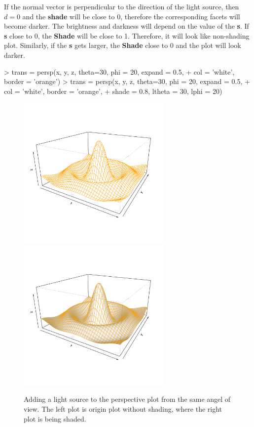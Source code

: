 \documentclass{report}
\begin{document}
If the normal vector is perpendicular to the direction of the light source, then $d = 0$ and the \textbf{shade} will be close to 0, therefore the corresponding facets will become darker. The brightness and darkness will depend on the value of the \textbf{s}. If \textbf{s} close to 0, the \textbf{Shade} will be close to 1. Therefore, it will look like non-shading plot. Similarly, if the \textbf{s} gets larger, the \textbf{Shade} close to 0 and the plot will look darker.

\begin{Schunk}
\begin{Sinput}
> trans = persp(x, y, z, theta=30, phi = 20, expand = 0.5,
+               col = 'white', border = 'orange')
> trans = persp(x, y, z, theta=30, phi = 20, expand = 0.5,
+               col = 'white', border = 'orange', 
+               shade = 0.8, ltheta = 30, lphi = 20)
\end{Sinput}
\end{Schunk}


\begin{figure}[h]
	\begin{center}
		\includegraphics[height = 7.5cm, width = 7.5cm]{figure/Lighting_1.pdf}
		\includegraphics[height = 7.5cm, width = 7.5cm]{figure/Lighting_2.pdf}
		\caption{Adding a light source to the perspective plot from the same angel of view. The left plot is origin plot without shading, where the right plot is being shaded.}
		\label{figure_3.3}
	\end{center}
\end{figure}
\end{document}

